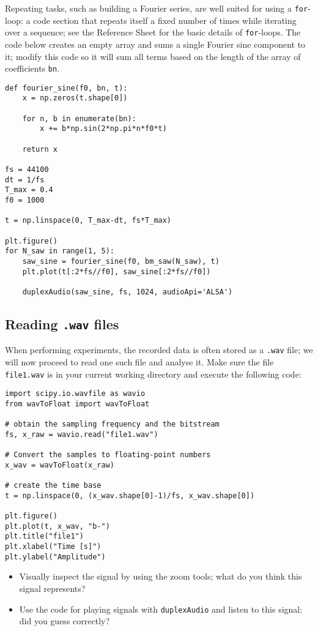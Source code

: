 Repeating tasks, such as building a Fourier series, are well suited for using a {\tt for}-loop: a code section that repeats itself a fixed number of times while iterating over a sequence; see the Reference Sheet for the basic details of {\tt for}-loops. The code below creates an empty array and sums a single Fourier sine component to it; modify this code so it will sum all terms based on the length of the array of coefficients {\tt bn}.

\begin{lstlisting}[frame=single]
def fourier_sine(f0, bn, t):
    x = np.zeros(t.shape[0])

    for n, b in enumerate(bn):
        x += b*np.sin(2*np.pi*n*f0*t)

    return x

fs = 44100
dt = 1/fs
T_max = 0.4
f0 = 1000

t = np.linspace(0, T_max-dt, fs*T_max)

plt.figure()
for N_saw in range(1, 5):
    saw_sine = fourier_sine(f0, bm_saw(N_saw), t)
    plt.plot(t[:2*fs//f0], saw_sine[:2*fs//f0])

    duplexAudio(saw_sine, fs, 1024, audioApi='ALSA')
\end{lstlisting}


\subsection{Reading {\tt .wav} files}

When performing experiments, the recorded data is often stored as a {\tt .wav} file; we will now proceed to read one such file and analyse it. Make sure the file {\tt file1.wav} is in your current working directory and execute the following code:

\begin{lstlisting}[frame=single]
import scipy.io.wavfile as wavio
from wavToFloat import wavToFloat

# obtain the sampling frequency and the bitstream
fs, x_raw = wavio.read("file1.wav")

# Convert the samples to floating-point numbers
x_wav = wavToFloat(x_raw)

# create the time base
t = np.linspace(0, (x_wav.shape[0]-1)/fs, x_wav.shape[0])

plt.figure()
plt.plot(t, x_wav, "b-")
plt.title("file1")
plt.xlabel("Time [s]")
plt.ylabel("Amplitude")
\end{lstlisting}

\begin{itemize}
	\item Visually inspect the signal by using the zoom tools; what do you think this signal represents? 
	\item Use the code for playing signals with {\tt duplexAudio} and listen to this signal; did you guess correctly?
\end{itemize}

